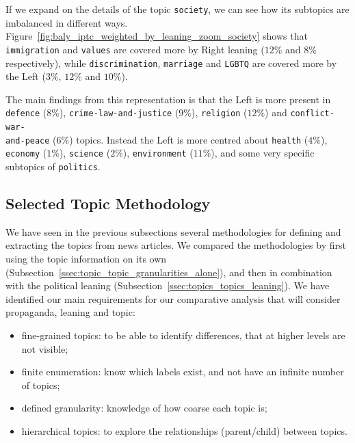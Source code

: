 If we expand on the details of the topic \texttt{society}, we can see how its subtopics are imbalanced in different ways. Figure~\ref{fig:baly_iptc_weighted_by_leaning_zoom_society} shows that \texttt{immigration} and \texttt{values} are covered more by Right leaning ($12\%$ and $8\%$ respectively), while \texttt{discrimination}, \texttt{marriage}
and \texttt{LGBTQ} are covered more by the Left ($3\%$, $12\%$ and $10\%$). 

The main findings from this representation is that the Left is more present in \texttt{defence} ($8\%$), \texttt{crime-law-and-justice} ($9\%$), \texttt{religion} ($12\%$) and \texttt{conflict-war-\\and-peace} ($6\%$) topics. Instead the Left is more centred about \texttt{health} ($4\%$), \texttt{economy} ($1\%$), \texttt{science} ($2\%$), \texttt{environment} ($11\%$), and some very specific subtopics of \texttt{politics}.


\subsection{\statusgreen Selected Topic Methodology}
\label{ssec:topic_topic_choice}

We have seen in the previous subsections several methodologies for defining and extracting the topics from news articles.
We compared the methodologies by first using the topic information on its own (Subsection~\ref{ssec:topic_topic_granularities_alone}), and then in combination with the political leaning (Subsection~\ref{ssec:topics_topics_leaning}).
We have identified our main requirements for our comparative analysis that will consider propaganda, leaning and topic:

\begin{itemize}
    \item fine-grained topics: to be able to identify differences, that at higher levels are not visible;
    \item finite enumeration: know which labels exist, and not have an infinite number of topics;
    \item defined granularity: knowledge of how coarse each topic is; %
    \item hierarchical topics: to explore the relationships (parent/child) between topics.
\end{itemize}


